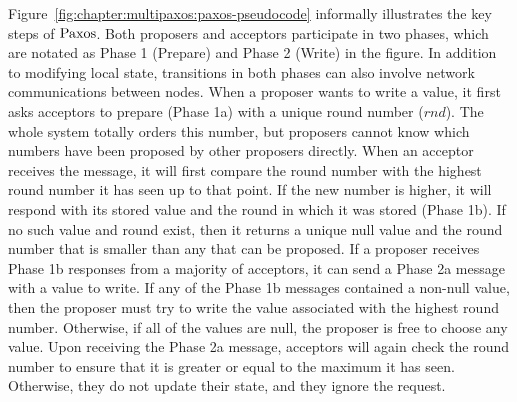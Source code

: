 Figure~\ref{fig:chapter:multipaxos:paxos-pseudocode} informally illustrates the key steps of $\mathrm{Paxos}$.
Both proposers and acceptors participate in two phases, which are notated as Phase 1 (Prepare) and Phase 2 (Write) in the figure.
In addition to modifying local state, transitions in both phases can also involve network communications between nodes.
When a proposer wants to write a value, it first asks acceptors to prepare (Phase 1a) with a unique round number ($rnd$).
The whole system totally orders this number, but proposers cannot know which numbers have been proposed by other proposers directly.
When an acceptor receives the message, it will first compare the round number with the highest round number it has seen up to that point.
If the new number is higher, it will respond with its stored value and the round in which it was stored (Phase 1b).
If no such value and round exist, then it returns a unique null value and the round number that is smaller than any that can be proposed.
If a proposer receives Phase 1b responses from a majority of acceptors, it can send a Phase 2a message with a value to write.
If any of the Phase 1b messages contained a non-null value, then the proposer must try to write the value associated with the highest round number.
Otherwise, if all of the values are null, the proposer is free to choose any value.
Upon receiving the Phase 2a message, acceptors will again check the round number to ensure that it is greater or equal to the maximum it has seen.
Otherwise, they do not update their state, and they ignore the request.


